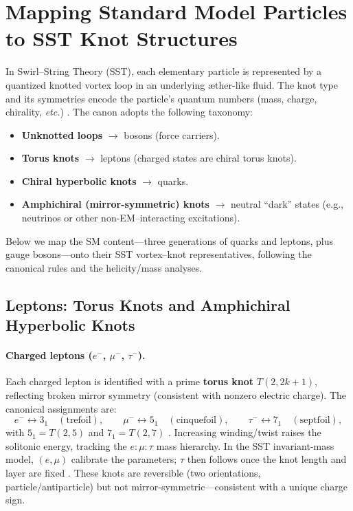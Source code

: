\documentclass[11pt]{article}
\begin{document}
\section{Mapping Standard Model Particles to SST Knot Structures}

    In Swirl–String Theory (SST), each elementary particle is represented by a quantized knotted vortex loop in an underlying {\ae}ther-like fluid. The knot type and its symmetries encode the particle’s quantum numbers (mass, charge, chirality, \emph{etc.}) \cite{Iskandarani2025Canon,Iskandarani2025Lagrangian}. The canon adopts the following taxonomy:
    \begin{itemize}
    \item \textbf{Unknotted loops} $\rightarrow$ bosons (force carriers).
    \item \textbf{Torus knots} $\rightarrow$ leptons (charged states are chiral torus knots).
    \item \textbf{Chiral hyperbolic knots} $\rightarrow$ quarks.
    \item \textbf{Amphichiral (mirror-symmetric) knots} $\rightarrow$ neutral ``dark'' states (e.g., neutrinos or other non-EM–interacting excitations).
    \end{itemize}
    Below we map the SM content—three generations of quarks and leptons, plus gauge bosons—onto their SST vortex–knot representatives, following the canonical rules and the helicity/mass analyses.

    \subsection{Leptons: Torus Knots and Amphichiral Hyperbolic Knots}

        \paragraph{Charged leptons ($e^-$, $\mu^-$, $\tau^-$).}
            Each charged lepton is identified with a prime \textbf{torus knot} $T(2,2k{+}1)$, reflecting broken mirror symmetry (consistent with nonzero electric charge). The canonical assignments are:
            \[
                e^- \leftrightarrow 3_1\quad(\text{trefoil}),\qquad
                \mu^- \leftrightarrow 5_1\quad(\text{cinquefoil}),\qquad
                \tau^- \leftrightarrow 7_1\quad(\text{septfoil}),
            \]
            with $5_1=T(2,5)$ and $7_1=T(2,7)$ \cite{Iskandarani2025Canon,KnotAtlas}. Increasing winding/twist raises the solitonic energy, tracking the $e\!:\!\mu\!:\!\tau$ mass hierarchy. In the SST invariant-mass model, $(e,\mu)$ calibrate the parameters; $\tau$ then follows once the knot length and layer are fixed \cite{Iskandarani2025Mass}. These knots are reversible (two orientations, particle/antiparticle) but not mirror-symmetric—consistent with a unique charge sign.
\end{document}
